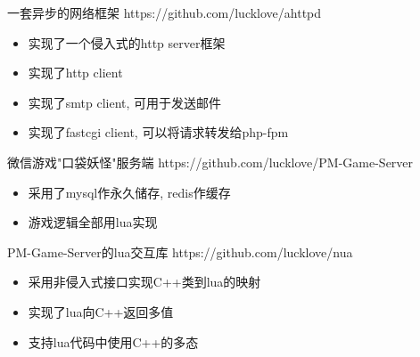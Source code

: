 \documentclass{resume}
\begin{document}
\begin{multicols}{2}
\begin{onehalfspacing}
一套异步的网络框架
\newline
https://github.com/lucklove/ahttpd
\begin{itemize}
  \item 实现了一个侵入式的http server框架
  \item 实现了http client
  \item 实现了smtp client, 可用于发送邮件
  \item 实现了fastcgi client, 可以将请求转发给php-fpm
\end{itemize}
\end{onehalfspacing}

\begin{onehalfspacing}
微信游戏"口袋妖怪"服务端
\newline
https://github.com/lucklove/PM-Game-Server
\begin{itemize}
  \item 采用了mysql作永久储存, redis作缓存
  \item 游戏逻辑全部用lua实现
\end{itemize}
\end{onehalfspacing}

\begin{onehalfspacing}
PM-Game-Server的lua交互库
\newline
https://github.com/lucklove/nua
\begin{itemize}
  \item 采用非侵入式接口实现C++类到lua的映射
  \item 实现了lua向C++返回多值
  \item 支持lua代码中使用C++的多态
\end{itemize}
\end{onehalfspacing}




\end{multicols}
\end{document}
